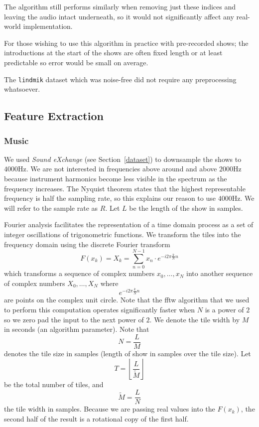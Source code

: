 \documentclass[twocolumn]{article}
\begin{document}
	The algorithm still performs similarly when removing just these indices and leaving the audio intact underneath, so it would not significantly affect any real-world implementation. 
	
	For those wishing to use this algorithm in practice with pre-recorded shows; the introductions at the start of the shows are often fixed length or at least predictable so error would be small on average.
	
	The \texttt{lindmik} dataset which was noise-free did not require any preprocessing whatsoever. 
	
	\subsection{Feature Extraction}\label{sec:feature-extraction}
	
	\subsubsection{Music}\label{feat_ex} %
	
	We used \textit{Sound eXchange} (see Section~\ref{dataset}) to downsample the shows to $4000$Hz. We are not interested in frequencies above around and above $2000$Hz because instrument harmonics become less visible in the spectrum as the frequency increases. The Nyquist theorem \cite{nyquist1928certain} states that the highest representable frequency is half the sampling rate, so this explains our reason to use $4000$Hz. We will refer to the sample rate as $R$. Let $L$ be the length of the show in samples.
	
	Fourier analysis facilitates the representation of a time domain process as a set of integer oscillations of trigonometric functions. We transform the tiles into the frequency domain using the discrete Fourier transform
\[
F(x_k) = X_k = \sum_{n=0}^{N-1} x_n \cdot e^{-i 2 \pi \frac{k}{N} n}
\] which transforms a sequence of complex numbers $x_0,\ldots,x_N$ into another sequence of complex numbers $X_0,\ldots,X_N$ where $$e^{-i 2 \pi \frac{k}{N} n}$$ are points on the complex unit circle. Note that the fftw algorithm \cite{frigo2004fftw} that we used to perform this computation operates significantly faster when $N$ is a power of $2$ so we zero pad the input to the next power of $2$. We denote the tile width by $M$ in seconds (an algorithm parameter). Note that
\[
N = \frac{L}{M}
\] denotes the tile size in samples (length of show in samples over the tile size). Let 
\[
T = \left\lfloor\frac{L}{\tilde{M}}\right\rfloor
\] be the total number of tiles, and \[
\tilde{M}=\frac{L}{N}
\] the tile width in samples.
Because we are passing real values into the $F(x_k)$, the second half of the result is a rotational copy of the first half.
	
\end{document}
